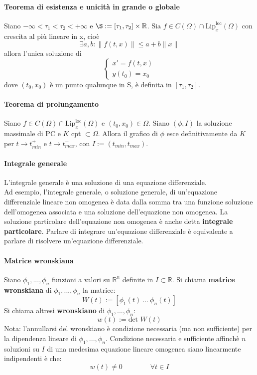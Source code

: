 \documentclass[a4paper,12pt]{article}
\begin{document}
\paragraph{Teorema di esistenza e unicità in grande o globale}
Siano $-\infty < \tau_1 < \tau_2 < +\infty$ e $\S:=\left[\tau_1,\tau_2\right]\times\mathbb{R}$. Sia $f \in C\left(\Omega\right) \cap \text{Lip}^{\text{loc}}_x\left(\Omega\right)$ con crescita al più lineare in x, cioè
$$\exists a,b: \|f \left(t,x\right)\|\leq a + b\|x\|$$
allora l'unica soluzione di 
$$\begin{cases} x'=f\left(t,x\right) \\ y\left(t_0\right)=x_0 \end{cases}$$
dove $\left(t_0,x_0\right)$ è un punto qualunque in S, è definita in $\left[\tau_1,\tau_2\right]$.

\paragraph{Teorema di prolungamento}
Siano  $f \in C\left(\Omega\right) \cap \text{Lip}^{\text{loc}}_x\left(\Omega\right)$ e $\left(t_0,x_0\right) \in \Omega$. Siano $\left(\phi,I\right)$ la soluzione massimale di PC e $K$ cpt $\subset \Omega$. Allora il grafico di $\phi$ esce definitivamente da $K$ per $t\rightarrow t^+_{min}$ e $t\rightarrow t^-_{max}$, con $I:=(t_{min},t_{max})$.

\paragraph{Integrale generale}
L'integrale generale è una soluzione di una equazione differenziale.\\
Ad esempio, l'integrale generale, o soluzione generale, di un'equazione differenziale lineare non omogenea è data dalla somma tra una funzione soluzione dell'omogenea associata e una soluzione dell'equazione non omogenea. La soluzione particolare dell'equazione non omogenea è anche detta \textbf{integrale particolare}. Parlare di integrare un'equazione differenziale è equivalente a parlare di risolvere un'equazione differenziale.

\paragraph{Matrice wronskiana}
Siano $\phi_1,...,\phi_n$ funzioni a valori su $\mathbb{R}^n$ definite in $I\subset \mathbb{R}$.
Si chiama \textbf{matrice wronskiana} di $\phi_1,...,\phi_n$ la matrice:
$$W(t):=[\phi_1(t)\ ...\ \phi_n(t)]$$
Si chiama altresì \textbf{wronskiano} di $\phi_1,...,\phi_n$:
$$w(t):=\text{det } W(t)$$
Nota: l'annullarsi del wronskiano è condizione necessaria (ma non sufficiente) per la dipendenza lineare di $\phi_1,...,\phi_n$. 
Condizione necessaria e sufficiente affinchè $n$ soluzioni su $I$ di una medesima equazione lineare omogenea siano linearmente indipendenti è che:
$$ w(t)\neq0 \qquad\qquad \forall t \in I$$
\end{document}
